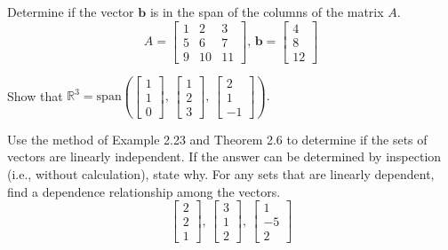 \documentclass[12pt,letterpaper]{hmcpset}
\begin{document}

\begin{problem}[2.3.8]
Determine if the vector $\mathbf{b}$ is in the span of the columns of the matrix $A$. $$ A = \begin{bmatrix}
    1 & 2 & 3\\
    5 & 6 & 7\\
    9 & 10 & 11
\end{bmatrix}\text{, } \mathbf{b} =\begin{bmatrix}
	4\\
	8\\
    12
\end{bmatrix}$$

\end{problem}

\begin{solution}
\vfill
\end{solution}

\newpage

\begin{problem}[2.3.12]

Show that $\mathbb{R}^3 = \text{span}\left( \begin{bmatrix}
	1\\
	1\\
	0
\end{bmatrix}\text{, }\begin{bmatrix}
	1\\
	2\\
	3
\end{bmatrix}\text{, }\begin{bmatrix}
	2\\
	1\\
	-1
\end{bmatrix}\right).$

\end{problem}

\begin{solution}
\vfill
\end{solution}
\newpage

\begin{problem}[2.3.24]

Use the method of Example 2.23 and Theorem 2.6 to determine if the sets of vectors are linearly independent. If the answer can be determined by inspection (i.e., without calculation), state why. For any sets that are linearly dependent, find a dependence relationship among the vectors.$$\begin{bmatrix}
	2\\
	2\\
	1
\end{bmatrix}\text{, }\begin{bmatrix}
	3\\
	1\\
	2
\end{bmatrix}\text{, }\begin{bmatrix}
	1\\
	-5\\
	2
\end{bmatrix}$$

\end{problem}
\end{document}
